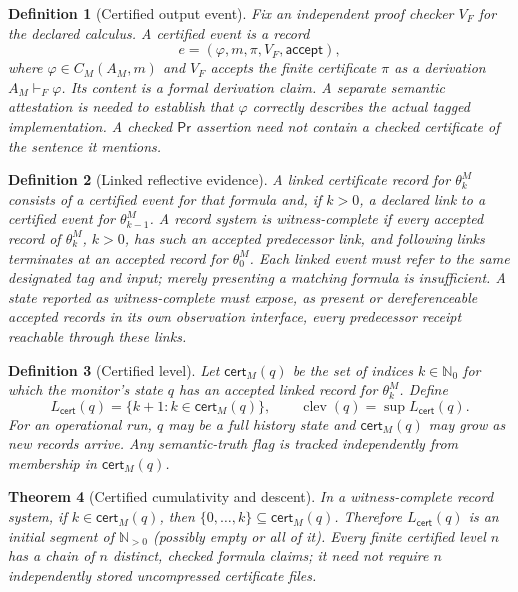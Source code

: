 \documentclass[11pt,letterpaper]{article}
\newtheorem{theorem}{Theorem}[section]
\newtheorem{definition}[theorem]{Definition}
\newcommand{\Cert}{\mathsf{cert}}
\newcommand{\Prv}{\mathsf{Pr}}
\newcommand{\clev}{\operatorname{clev}}
\newcommand{\Nzero}{\mathbb N_0}
\begin{document}
\begin{definition}[Certified output event]\label{def:event}
Fix an independent proof checker $V_F$ for the declared calculus. A \emph{certified event} is a record
\[
 e=(\varphi,m,\pi,V_F,\mathsf{accept}),
\]
where $\varphi\in C_M(A_M,m)$ and $V_F$ accepts the finite certificate $\pi$ as a derivation $A_M\vdash_F\varphi$. Its content is a \emph{formal derivation claim}. A separate semantic attestation is needed to establish that $\varphi$ correctly describes the actual tagged implementation. A checked $\Prv$ assertion need not contain a checked certificate of the sentence it mentions.
\end{definition}
\begin{definition}[Linked reflective evidence]\label{def:linked}
A \emph{linked certificate record} for $\theta_k^M$ consists of a certified event for that formula and, if $k>0$, a declared link to a certified event for $\theta_{k-1}^M$. A record system is \emph{witness-complete} if every accepted record of $\theta_k^M$, $k>0$, has such an accepted predecessor link, and following links terminates at an accepted record for $\theta_0^M$. Each linked event must refer to the same designated tag and input; merely presenting a matching formula is insufficient. A state reported as witness-complete must expose, as present or dereferenceable accepted records in its own observation interface, every predecessor receipt reachable through these links.
\end{definition}
\begin{definition}[Certified level]\label{def:clevel}
Let $\Cert_M(q)$ be the set of indices $k\in\Nzero$ for which the monitor's state $q$ has an accepted linked record for $\theta_k^M$. Define
\[
 L_{\Cert}(q)=\{k+1:k\in\Cert_M(q)\},\qquad
 \clev(q)=\sup L_{\Cert}(q).
\]
For an operational run, $q$ may be a full history state and $\Cert_M(q)$ may grow as new records arrive. Any semantic-truth flag is tracked independently from membership in $\Cert_M(q)$.
\end{definition}
\begin{theorem}[Certified cumulativity and descent]\label{thm:descent}
In a witness-complete record system, if $k\in\Cert_M(q)$, then $\{0,\ldots,k\}\subseteq\Cert_M(q)$. Therefore $L_{\Cert}(q)$ is an initial segment of $\mathbb N_{>0}$ (possibly empty or all of it). Every finite certified level $n$ has a chain of $n$ distinct, checked \emph{formula claims}; it need not require $n$ independently stored uncompressed certificate files.
\end{theorem}
\end{document}
